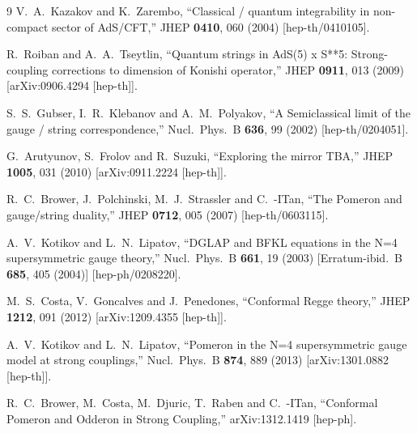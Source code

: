 \documentclass[a4paper,11pt]{article}
\numberwithin{equation}{section}
\begin{document}
\begin{thebibliography} {9}
  V.~A.~Kazakov and K.~Zarembo,
  ``Classical / quantum integrability in non-compact sector of AdS/CFT,''
  JHEP {\bf 0410}, 060 (2004)
  [hep-th/0410105].

  R.~Roiban and A.~A.~Tseytlin,
  ``Quantum strings in AdS(5) x S**5: Strong-coupling corrections to dimension of Konishi operator,''
  JHEP {\bf 0911}, 013 (2009)
  [arXiv:0906.4294 [hep-th]].

  S.~S.~Gubser, I.~R.~Klebanov and A.~M.~Polyakov,
  ``A Semiclassical limit of the gauge / string correspondence,''
  Nucl.\ Phys.\ B {\bf 636}, 99 (2002)
  [hep-th/0204051].

  G.~Arutyunov, S.~Frolov and R.~Suzuki,
  ``Exploring the mirror TBA,''
  JHEP {\bf 1005}, 031 (2010)
  [arXiv:0911.2224 [hep-th]].

  R.~C.~Brower, J.~Polchinski, M.~J.~Strassler and C.~-ITan,
  ``The Pomeron and gauge/string duality,''
  JHEP {\bf 0712}, 005 (2007)
  [hep-th/0603115].

  A.~V.~Kotikov and L.~N.~Lipatov,
  ``DGLAP and BFKL equations in the N=4 supersymmetric gauge theory,''
  Nucl.\ Phys.\ B {\bf 661}, 19 (2003)
  [Erratum-ibid.\ B {\bf 685}, 405 (2004)]
  [hep-ph/0208220].

  M.~S.~Costa, V.~Goncalves and J.~Penedones,
  ``Conformal Regge theory,''
  JHEP {\bf 1212}, 091 (2012)
  [arXiv:1209.4355 [hep-th]].

  A.~V.~Kotikov and L.~N.~Lipatov,
  ``Pomeron in the N=4 supersymmetric gauge model at strong couplings,''
  Nucl.\ Phys.\ B {\bf 874}, 889 (2013)
  [arXiv:1301.0882 [hep-th]].

  R.~C.~Brower, M.~Costa, M.~Djuric, T.~Raben and C.~-ITan,
  ``Conformal Pomeron and Odderon in Strong Coupling,''
  arXiv:1312.1419 [hep-ph].


\end{thebibliography}
\end{document}
